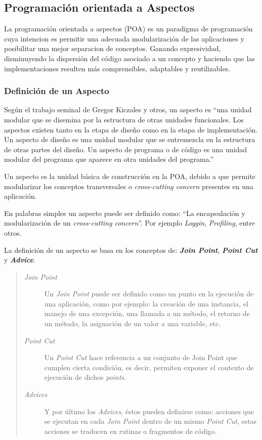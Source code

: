 \subsection{Programación orientada a Aspectos}

	La programación orientada a aspectos (POA) es un paradigma de programación cuya
	intencion es permitir una adecuada modularización de las aplicaciones
	y posibilitar una mejor separacion de conceptos. Ganando expresividad,
	disminuyendo la dispersión del código asociado a un concepto y haciendo que
	las implementaciones resulten más comprensibles, adaptables y reutilizables.


\subsubsection{Definición de un Aspecto}
	Según el trabajo seminal de Gregor Kiczales y otros, un aspecto es 
	``una unidad modular que se disemina por la estructura de
	otras unidades funcionales. Los aspectos existen tanto en la etapa de
	diseño como en la etapa de implementación. Un aspecto de diseño es
	una unidad modular que se entremezcla en la estructura de otras partes
	del diseño. Un aspecto de programa o de código es una unidad modular
	del programa que aparece en otra unidades del programa.'' \cite{Kicz97a}

	\bigskip
	
	Un aspecto es la unidad básica de construcción en la POA, debido a que permite
	modularizar los conceptos transversales o \emph{cross-cutting concern} presentes en una aplicación.
	
	En palabras simples un aspecto puede ser definido como: ``La encapsulación y
	modularización de un \emph{cross-cutting concern}''. Por ejemplo
	\emph{Loggin}, \emph{Profiling}, entre otros.
	
	
	La definición de un aspecto se basa en los conceptos de: {\bf \emph{Join
	Point}}, {\bf \emph{ Point Cut}} y {\bf \emph{ Advice}}.
	
	\begin{quote}
	
	\begin{description}
		\item[\emph{Join Point}] Un \emph{Join Point} puede ser definido como un punto
		en la ejecución de una aplicación, como por ejemplo: la creación de una instancia, el manejo de una
		excepción, una llamada a un método, el retorno de un método, la asignación de
		un valor a una variable, etc.
		
		\item[\emph{Point Cut}] Un \emph{Point Cut} hace referencia a un conjunto de
		Join Point que cumplen cierta condición, es decir, permiten exponer el contexto de
		ejecución de dichos \emph{points}.
		
		\item[\emph{Advices}] Y por último los \emph{Advices}, éstos pueden definirse
		como: acciones que se ejecutan en cada \emph{Join Point} dentro de un mismo
		\emph{Point Cut}, estas acciones se traducen en rutinas o fragmentos de
		código.
	
	\end{description}
	\end{quote}
	
	

